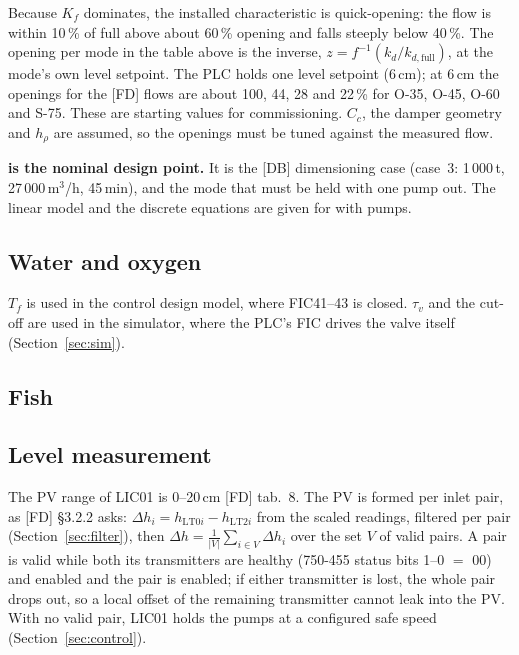 \documentclass[11pt]{article}
\begin{document}
Because $K_f$ dominates, the installed characteristic is quick-opening: the flow is within 10\,\%
of full above about 60\,\% opening and falls steeply below 40\,\%. The opening per mode in the
table above is the inverse, $z=f^{-1}(k_d/k_{d,\text{full}})$, at the mode's own level setpoint.
The PLC holds one level setpoint (6\,cm); at 6\,cm the openings for the [FD] flows are about
100, 44, 28 and 22\,\% for O-35, O-45, O-60 and S-75. These are starting values for
commissioning. $C_c$, the damper geometry and $h_\rho$ are assumed, so the openings must be
tuned against the measured flow.

\textbf{\CASNomMode{} is the nominal design point.} It is the [DB] dimensioning case (case~3:
1\,000\,t, 27\,000\,m$^3$/h, 45\,min), and the mode that must be held with one pump out. The
linear model and the discrete equations are given for \CASNomMode{} with \CASNomPumps{} pumps.

\subsection{Water and oxygen}




$T_f$ is used in the control design model, where FIC41--43 is closed. $\tau_v$ and the cut-off
are used in the simulator, where the PLC's FIC drives the valve itself
(Section~\ref{sec:sim}).

\subsection{Fish}


\subsection{Level measurement}\label{sec:levelpv}


The PV range of LIC01 is 0--20\,cm [FD] tab.~8. The PV is formed per inlet pair, as [FD] §3.2.2
asks: $\Delta h_i = h_{\text{LT0}i} - h_{\text{LT2}i}$ from the scaled readings, filtered per pair
(Section~\ref{sec:filter}), then $\Delta h = \frac{1}{|V|}\sum_{i\in V}\Delta h_i$ over the set $V$ of
valid pairs. A pair is valid while both its transmitters are healthy (750-455 status bits 1--0
$=$ 00) and enabled and the pair is enabled; if either transmitter is lost, the whole pair drops
out, so a local offset of the remaining transmitter cannot leak into the PV. With no valid pair,
LIC01 holds the pumps at a configured safe speed (Section~\ref{sec:control}).
\end{document}
